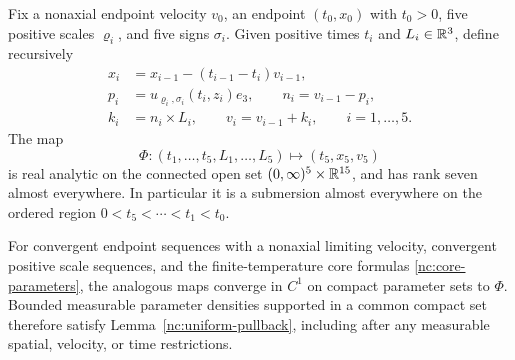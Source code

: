 \begin{lemma}
\label{lem:five-gain-rank}
Fix a nonaxial endpoint velocity \(v_0\), an endpoint
\((t_0,x_0)\) with \(t_0>0\), five positive scales
\(\varrho_i\), and five signs \(\sigma_i\).
Given positive times \(t_i\) and \(L_i\in\mathbb R^3\), define recursively
\begin{equation}
\label{nc:rank-map}
 \begin{split}
 x_i&=x_{i-1}-(t_{i-1}-t_i)v_{i-1},\\
 p_i&=u_{\varrho_i,\sigma_i}(t_i,z_i)e_3,\qquad
 n_i=v_{i-1}-p_i,\\
 k_i&=n_i\times L_i,\qquad v_i=v_{i-1}+k_i ,
 \qquad i=1,\ldots,5 .
 \end{split}
\end{equation}
The map
\[
 \Phi:(t_1,\ldots,t_5,L_1,\ldots,L_5)
       \longmapsto(t_5,x_5,v_5)
\]
is real analytic on the connected open set
\((0,\infty)^5\times\mathbb R^{15}\), and has rank seven almost everywhere.
In particular it is a submersion almost everywhere on the ordered
region \(0<t_5<\cdots<t_1<t_0\).

For convergent endpoint sequences with a nonaxial limiting velocity,
convergent positive scale sequences, and the finite-temperature
core formulas \eqref{nc:core-parameters}, the analogous maps converge
in \(C^1\) on compact parameter sets to \(\Phi\).
Bounded measurable parameter densities supported in a common
compact set therefore satisfy
Lemma~\ref{nc:uniform-pullback}, including after any measurable
spatial, velocity, or time restrictions.
\end{lemma}

